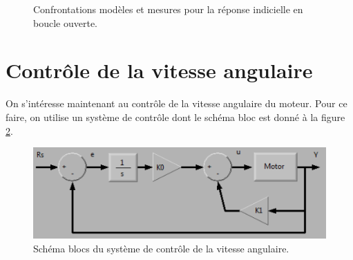 \documentclass[frenchb, paper=a4, fontsize=11pt]{scrartcl}
\numberwithin{equation}{section}					%
\numberwithin{figure}{section}					%
\numberwithin{table}{section}						%
\begin{document}
\begin{figure}[ht]
	\centering
	
	\caption{Confrontations modèles et mesures pour la réponse
	indicielle en boucle ouverte.}
	\label{fig:open-loop-step-response_model}
\end{figure}

\section{Contrôle de la vitesse angulaire}
On s'intéresse maintenant au contrôle de la vitesse angulaire
du moteur. Pour ce faire, on utilise un système de contrôle
dont le schéma bloc est donné à la figure
\ref{fig:block_diagram_angular_speed_control}.

\begin{figure}[ht]
	\centering
	\includegraphics[scale=0.7]{img/block_diagram_angular_speed_control.png}
	\caption{Schéma blocs du système de contrôle de la
	vitesse angulaire.}
	\label{fig:block_diagram_angular_speed_control}
\end{figure}
\end{document}
